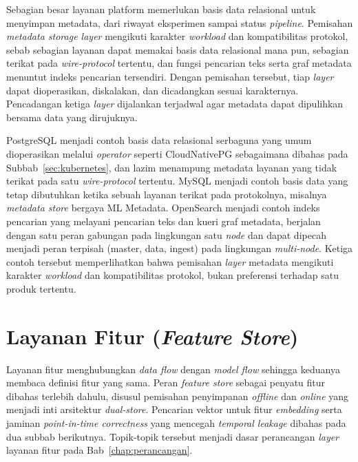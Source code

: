Sebagian besar layanan platform memerlukan basis data relasional untuk menyimpan metadata, dari riwayat eksperimen sampai status \textit{pipeline}. Pemisahan \textit{metadata storage layer} mengikuti karakter \textit{workload} dan kompatibilitas protokol, sebab sebagian layanan dapat memakai basis data relasional mana pun, sebagian terikat pada \textit{wire-protocol} tertentu, dan fungsi pencarian teks serta graf metadata menuntut indeks pencarian tersendiri. Dengan pemisahan tersebut, tiap \textit{layer} dapat dioperasikan, diskalakan, dan dicadangkan sesuai karakternya. Pencadangan ketiga \textit{layer} dijalankan terjadwal agar metadata dapat dipulihkan bersama data yang dirujuknya.

PostgreSQL \autocite{postgresql2025} menjadi contoh basis data relasional serbaguna yang umum dioperasikan melalui \textit{operator} seperti CloudNativePG sebagaimana dibahas pada Subbab~\ref{sec:kubernetes}, dan lazim menampung metadata layanan yang tidak terikat pada satu \textit{wire-protocol} tertentu. MySQL \autocite{mysql2025} menjadi contoh basis data yang tetap dibutuhkan ketika sebuah layanan terikat pada protokolnya, misalnya \textit{metadata store} bergaya ML Metadata. OpenSearch \autocite{opensearch2025} menjadi contoh indeks pencarian yang melayani pencarian teks dan kueri graf metadata, berjalan dengan satu peran gabungan pada lingkungan satu \textit{node} dan dapat dipecah menjadi peran terpisah (master, data, ingest) pada lingkungan \textit{multi-node}. Ketiga contoh tersebut memperlihatkan bahwa pemisahan \textit{layer} metadata mengikuti karakter \textit{workload} dan kompatibilitas protokol, bukan preferensi terhadap satu produk tertentu.

\section{Layanan Fitur (\textit{Feature Store})}
\label{sec:feature-store}

Layanan fitur menghubungkan \textit{data flow} dengan \textit{model flow} sehingga keduanya membaca definisi fitur yang sama. Peran \textit{feature store} sebagai penyatu fitur dibahas terlebih dahulu, disusul pemisahan penyimpanan \textit{offline} dan \textit{online} yang menjadi inti arsitektur \textit{dual-store}. Pencarian vektor untuk fitur \textit{embedding} serta jaminan \textit{point-in-time correctness} yang mencegah \textit{temporal leakage} dibahas pada dua subbab berikutnya. Topik-topik tersebut menjadi dasar perancangan \textit{layer} layanan fitur pada Bab~\ref{chap:perancangan}.

